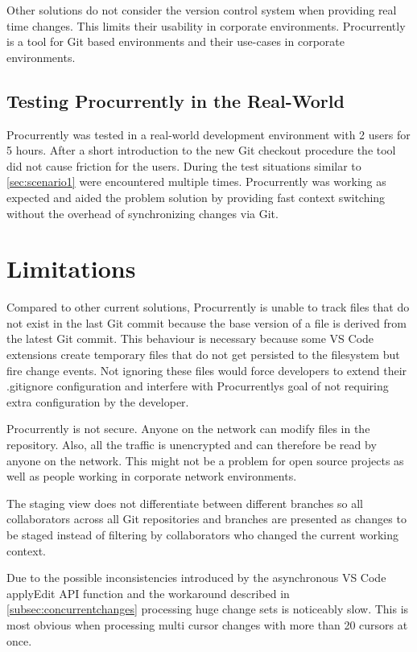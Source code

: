 Other solutions do not consider the version control system when providing real time changes. This limits their usability in corporate environments. Procurrently is a tool for Git based environments and their use-cases in corporate environments. 

\subsection{Testing Procurrently in the Real-World}

Procurrently was tested in a real-world development environment with 2 users for 5 hours. After a short introduction to the new Git checkout procedure the tool did not cause friction for the users. During the test situations similar to \autoref{sec:scenario1} were encountered multiple times. Procurrently was working as expected and aided the problem solution by providing fast context switching without the overhead of synchronizing changes via Git.

\section{Limitations}

Compared to other current solutions, Procurrently is unable to track files that do not exist in the last Git commit because the base version of a file is derived from the latest Git commit. This behaviour is necessary because some VS Code extensions create temporary files that do not get persisted to the filesystem but fire change events. Not ignoring these files would force developers to extend their .gitignore configuration and interfere with Procurrentlys goal of not requiring extra configuration by the developer.

Procurrently is not secure. Anyone on the network can modify files in the repository. Also, all the traffic is unencrypted and can therefore be read by anyone on the network. This might not be a problem for open source projects as well as people working in corporate network environments.

The staging view does not differentiate between different branches so all collaborators across all Git repositories and branches are presented as changes to be staged instead of filtering by collaborators who changed the current working context.

Due to the possible inconsistencies introduced by the asynchronous VS Code applyEdit API function and the workaround described in \autoref{subsec:concurrentchanges} processing huge change sets is noticeably slow. This is most obvious when processing multi cursor changes with more than 20 cursors at once.

